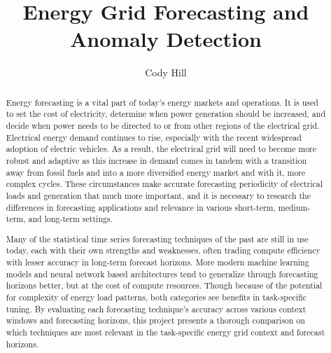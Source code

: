 \documentclass[sigconf]{acmart}
\begin{document}
\title{Energy Grid Forecasting and Anomaly Detection}


\author{Cody Hill}


\renewcommand{\shortauthors}{C. Hill}

\begin{abstract}
Energy forecasting is a vital part of today's energy markets and operations. It is used to set the cost of electricity, determine when power generation should be increased, and decide when power needs to be directed to or from other regions of the electrical grid. Electrical energy demand continues to rise, especially with the recent widespread adoption of electric vehicles. As a result, the electrical grid will need to become more robust and adaptive as this increase in demand comes in tandem with a transition away from fossil fuels and into a more diversified energy market  and with it, more complex cycles. These circumstances make accurate forecasting periodicity of electrical loads and generation that much more important, and it is necessary to research the differences in forecasting applications and relevance in various short-term, medium-term, and long-term settings.

Many of the statistical time series forecasting techniques of the past are still in use today, each with their own strengths and weaknesses, often trading compute efficiency with lesser accuracy in long-term forecast horizons. More modern machine learning models and neural network based architectures tend to generalize through forecasting horizons better, but at the cost of compute resources. Though because of the potential for complexity of energy load patterns, both categories see benefits in task-specific tuning. By evaluating each forecasting technique's accuracy across various context windows and forecasting horizons, this project presents a thorough comparison on which techniques are most relevant in the task-specific energy grid context and forecast horizons.
\end{abstract}
\end{document}

